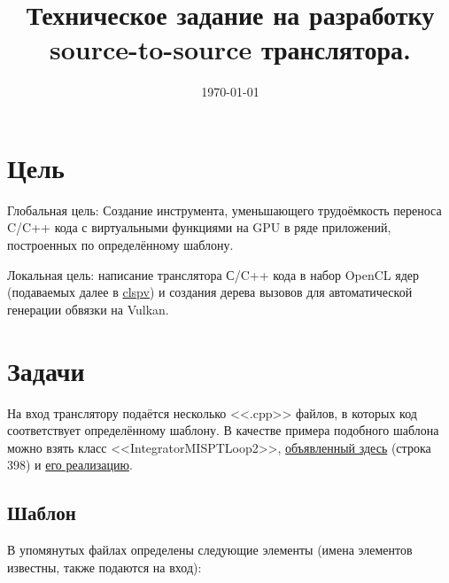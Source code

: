 \documentclass[a4paper,12pt]{article}
\title{Техническое задание на разработку source-to-source транслятора.}
\date{\today}
\begin{document}

\maketitle

\section{Цель}

Глобальная цель: Создание инструмента, уменьшающего трудоёмкость переноса C/C++ кода с виртуальными функциями на GPU в ряде приложений, построенных по определённому шаблону. 

Локальная цель: написание транслятора С/C++ кода в набор OpenCL ядер (подаваемых далее в \href{https://github.com/google/clspv}{clspv}) и создания дерева вызовов для автоматической генерации обвязки на Vulkan.

\section{Задачи}

На вход транслятору подаётся несколько <<.cpp>> файлов, в которых код соответствует определённому шаблону.  В качестве примера подобного шаблона можно взять класс <<IntegratorMISPTLoop2>>, \href{https://github.com/Ray-Tracing-Systems/HydraCore/blob/dev/hydra_drv/CPUExp_Integrators.h}{объявленный здесь} (строка 398) и \href{https://github.com/Ray-Tracing-Systems/HydraCore/blob/dev/hydra_drv/CPUExp_Integrators_PT_Loop.cpp}{его реализацию}.

\subsection{Шаблон}

В упомянутых файлах определены следующие элементы (имена элементов известны, также подаются на вход):
\end{document}
